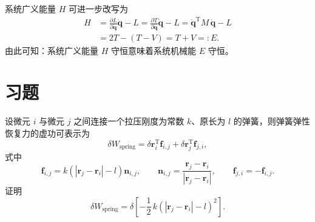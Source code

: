 系统广义能量 $H$ 可进一步改写为
\begin{equation}\label{eq:2.34}
\begin{aligned}
H &= \frac{\partial L}{\partial \dot{\boldsymbol{q}}} \dot{\boldsymbol{q}} - L = \frac{\partial T}{\partial \dot{\boldsymbol{q}}} \dot{\boldsymbol{q}} - L = \dot{\boldsymbol{q}}^{\mathrm{T}} M\,\dot{\boldsymbol{q}} - L \\
&= 2T - (T - V) = T + V =: E.
\end{aligned}
\end{equation}
由此可知：系统广义能量 $H$ 守恒意味着系统机械能 $E$ 守恒。

\section*{习题}

设微元 $i$ 与微元 $j$ 之间连接一个拉压刚度为常数 $k$、原长为 $l$ 的弹簧，则弹簧弹性恢复力的虚功可表示为
\begin{equation*}
\delta W_{\text{spring}} = \delta\boldsymbol{r}_i^{\mathrm{T}} \boldsymbol{f}_{i,j} + \delta\boldsymbol{r}_j^{\mathrm{T}} \boldsymbol{f}_{j,i},
\end{equation*}
式中
\begin{equation*}
\boldsymbol{f}_{i,j} = k \!\left(|\boldsymbol{r}_j - \boldsymbol{r}_i| - l\right) \boldsymbol{n}_{i,j}, \qquad
\boldsymbol{n}_{i,j} = \frac{\boldsymbol{r}_j - \boldsymbol{r}_i}{|\boldsymbol{r}_j - \boldsymbol{r}_i|}, \qquad
\boldsymbol{f}_{j,i} = -\boldsymbol{f}_{i,j}.
\end{equation*}
证明
\begin{equation*}
\delta W_{\text{spring}} = \delta\!\left[-\frac{1}{2}\,k \!\left(|\boldsymbol{r}_j - \boldsymbol{r}_i| - l\right)^{\!2}\right].
\end{equation*}

